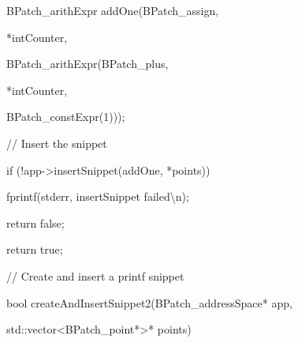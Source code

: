 {{{{{{

BPatch_arithExpr addOne(BPatch_assign,}



{

*intCounter,}



{

BPatch_arithExpr(BPatch_plus,



{

*intCounter,



{

BPatch_constExpr(1)));}





\bigskip



{

// Insert the snippet}



{

if (!app->insertSnippet(addOne, *points)) {}



{

fprintf(stderr, {\textquotedbl}insertSnippet failed{\textbackslash}n{\textquotedbl});}



{

return false;}



{

}}



{

return true;}



{

}}





\bigskip



{

// Create and insert a printf snippet}



{

bool createAndInsertSnippet2(BPatch_addressSpace* app,}



{

std::vector<BPatch_point*>* points) {}



}}}}}}}
